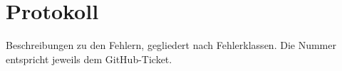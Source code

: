 %



\newpage



\section{Protokoll}
\label{Abschnitt:Programmfehler:Protokoll}

Beschreibungen zu den Fehlern, gegliedert nach Fehlerklassen. Die Nummer entspricht jeweils dem GitHub-Ticket.\\


